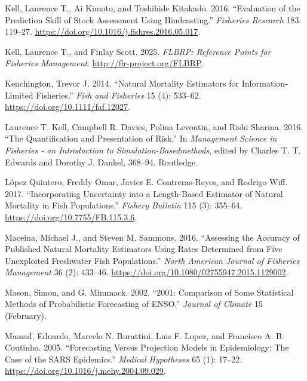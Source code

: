 \documentclass[
]{book}
\newlength{\cslhangindent}
\newlength{\cslentryspacingunit} %
\newenvironment{CSLReferences}[2] %
 {%
  \setlength{\parindent}{0pt}
  \ifodd #1
  \let\oldpar\par
  \def\par{\hangindent=\cslhangindent\oldpar}
  \fi
  \setlength{\parskip}{#2\cslentryspacingunit}
 }%
 {}
\begin{document}
\begin{CSLReferences}{1}{0}
\leavevmode{}%
Kell, Laurence T., Ai Kimoto, and Toshihide Kitakado. 2016. {``Evaluation of the Prediction Skill of Stock Assessment Using Hindcasting.''} \emph{Fisheries Research} 183: 119--27. \url{https://doi.org/10.1016/j.fishres.2016.05.017}.

\leavevmode{}%
Kell, Laurence T., and Finlay Scott. 2025. \emph{FLBRP: Reference Points for Fisheries Management}. \url{http://flr-project.org/FLBRP}.

\leavevmode{}%
Kenchington, Trevor J. 2014. {``Natural Mortality Estimators for Information-Limited Fisheries.''} \emph{Fish and Fisheries} 15 (4): 533--62. \url{https://doi.org/10.1111/faf.12027}.

\leavevmode{}%
Laurence T. Kell, Campbell R. Davies, Polina Levontin, and Rishi Sharma. 2016. {``The Quantification and Presentation of Risk.''} In \emph{Management Science in Fisheries - an Introduction to Simulation-Basedmethods}, edited by Charles T. T. Edwards and Dorothy J. Dankel, 368--94. Routledge.

\leavevmode{}%
López Quintero, Freddy Omar, Javier E. Contreras-Reyes, and Rodrigo Wiff. 2017. {``Incorporating Uncertainty into a Length-Based Estimator of Natural Mortality in Fish Populations.''} \emph{Fishery Bulletin} 115 (3): 355--64. \url{https://doi.org/10.7755/FB.115.3.6}.

\leavevmode{}%
Maceina, Michael J., and Steven M. Sammons. 2016. {``Assessing the Accuracy of Published Natural Mortality Estimators Using Rates Determined from Five Unexploited Freshwater Fish Populations.''} \emph{North American Journal of Fisheries Management} 36 (2): 433--46. \url{https://doi.org/10.1080/02755947.2015.1129002}.

\leavevmode{}%
Mason, Simon, and G. Mimmack. 2002. {``2001: Comparison of Some Statistical Methods of Probabilistic Forecasting of ENSO.''} \emph{Journal of Climate} 15 (February).

\leavevmode{}%
Massad, Eduardo, Marcelo N. Burattini, Luis F. Lopez, and Francisco A. B. Coutinho. 2005. {``Forecasting Versus Projection Models in Epidemiology: The Case of the SARS Epidemics.''} \emph{Medical Hypotheses} 65 (1): 17--22. \url{https://doi.org/10.1016/j.mehy.2004.09.029}.


\end{CSLReferences}
\end{document}

